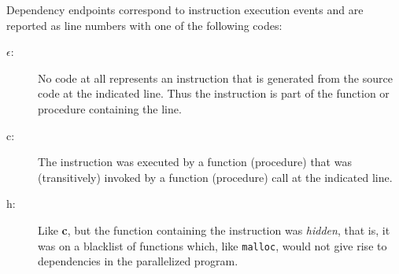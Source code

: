 Dependency endpoints correspond to instruction execution events and
are reported as line numbers with one of the following codes:
\begin{description}
\item[$\epsilon$:] 
No code at all represents an instruction that is
generated from the source code at the indicated line. Thus the 
instruction is part of the function or procedure containing the 
line.
\item[c:]
The instruction was executed by a function (procedure) that was 
(transitively) invoked by a function (procedure) call at the indicated 
line.
\item[h:]
Like {\bf c}, but the function containing the instruction was 
{\em hidden}, that is, it was on a blacklist of functions which, 
like {\tt malloc}, would not give rise to dependencies in the 
parallelized program.
\end{description}


\begin{figure} 
\small

\end{figure}

\begin{figure} 
\small

\end{figure}

\begin{figure} 
\small

\end{figure}

\begin{figure} 
\small

\end{figure}

\begin{figure} 
\small

\end{figure}

\begin{figure} 
\small

\end{figure}


\begin{figure*} 
\small

\end{figure*}

\begin{figure} 
\small

\end{figure}

